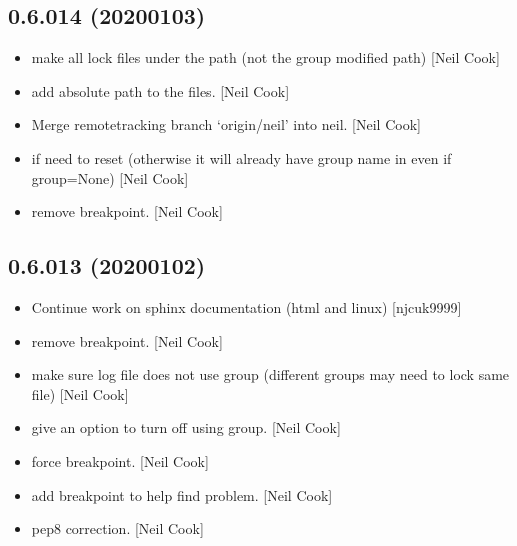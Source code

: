 \documentclass[a4paper,10pt,english]{report}
\begin{document}
\subsection{0.6.014 (2020\sphinxhyphen{}01\sphinxhyphen{}03)}
\label{\detokenize{misc/changelog:id24}}\begin{itemize}
\item {} 
 \sphinxhyphen{} make all lock files under the  path (not
the group modified path) {[}Neil Cook{]}

\item {} 
 \sphinxhyphen{} add absolute path to the files. {[}Neil Cook{]}

\item {} 
Merge remote\sphinxhyphen{}tracking branch ‘origin/neil’ into neil. {[}Neil Cook{]}

\item {} 
 \sphinxhyphen{} if  need to reset 
(otherwise it will already have group name in even if group=None)
{[}Neil Cook{]}

\item {} 
 \sphinxhyphen{} remove breakpoint. {[}Neil Cook{]}

\end{itemize}


\subsection{0.6.013 (2020\sphinxhyphen{}01\sphinxhyphen{}02)}
\label{\detokenize{misc/changelog:id25}}\begin{itemize}
\item {} 
Continue work on sphinx documentation (html and linux) {[}njcuk9999{]}

\item {} 
 \sphinxhyphen{} remove breakpoint. {[}Neil Cook{]}

\item {} 
 \sphinxhyphen{} make sure log file does not use group
(different groups may need to lock same file) {[}Neil Cook{]}

\item {} 
 \sphinxhyphen{} give an option to turn off using group. {[}Neil
Cook{]}

\item {} 
 \sphinxhyphen{} force breakpoint. {[}Neil Cook{]}

\item {} 
 \sphinxhyphen{} add breakpoint to help find
problem. {[}Neil Cook{]}

\item {} 
 \sphinxhyphen{} pep8 correction. {[}Neil Cook{]}

\end{itemize}
\end{document}
